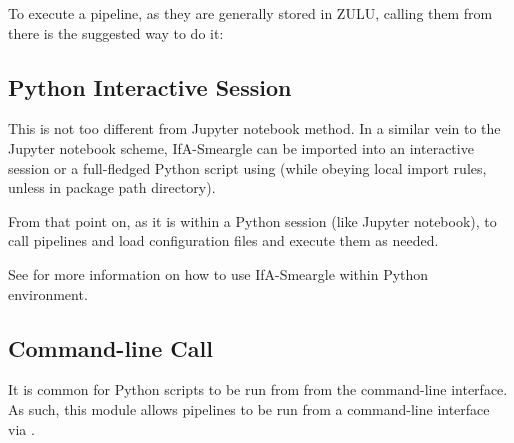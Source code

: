 \documentclass[letterpaper,10pt,english]{sphinxmanual}
\begin{document}
\begin{sphinxVerbatim}[commandchars=\\\{\}]
  
\end{sphinxVerbatim}

To execute a pipeline, as they are generally stored in ZULU, calling them
from there is the suggested way to do it:

\begin{sphinxVerbatim}[commandchars=\\\{\}]
   
\end{sphinxVerbatim}


\subsection{Python Interactive Session}
\label{\detokenize{how_to_use:python-interactive-session}}
This is not too different from Jupyter notebook method. In a similar vein to
the Jupyter notebook scheme, IfA-Smeargle can be imported into an interactive
session or a full-fledged Python script using 
(while obeying local import rules, unless in package path directory).

From that point on, as it is within a Python session (like Jupyter notebook),
to call pipelines and load configuration files and execute them as needed.

See {\hyperref[\detokenize{how_to_use:jupyter-notebook}]{}} for more information on how to use IfA-Smeargle within
Python environment.


\subsection{Command-line Call}
\label{\detokenize{how_to_use:command-line-call}}
It is common for Python scripts to be run from from the command-line interface.
As such, this module allows pipelines to be run from a command-line interface
via .
\end{document}
